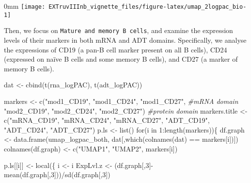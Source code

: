 \documentclass[]{article}
\newcommand{\hlnum}[1]{\textcolor[rgb]{0.816,0.125,0.439}{#1}}%
\newcommand{\hlstr}[1]{\textcolor[rgb]{0.251,0.627,0.251}{#1}}%
\newcommand{\hlcom}[1]{\textcolor[rgb]{0.502,0.502,0.502}{\textit{#1}}}%
\newcommand{\hlstd}[1]{\textcolor[rgb]{0.251,0.251,0.251}{#1}}%
\newcommand{\hlkwd}[1]{\textcolor[rgb]{0.878,0.439,0.125}{#1}}%
\newenvironment{Shaded}{\begin{myshaded}}{\end{myshaded}}
\newcommand{\DecValTok}[1]{\hlnum{#1}}
\newcommand{\SpecialCharTok}[1]{\hlstr{#1}}
\newcommand{\StringTok}[1]{\hlstr{#1}}
\newcommand{\CommentTok}[1]{\hlcom{#1}}
\newcommand{\OtherTok}[1]{{#1}}
\newcommand{\FunctionTok}[1]{\hlstd{#1}}
\newcommand{\ControlFlowTok}[1]{\hlkwd{#1}}
\newcommand{\NormalTok}[1]{\hlstd{#1}}
\begin{document}
\begin{adjustwidth}{\fltoffset}{0mm}
\texttt{[image: EXTruvIIInb\_vignette\_files/figure-latex/umap\_2logpac\_bio-1]} \end{adjustwidth}

Then, we focus on \texttt{Mature and memory B cells}, and examine the expression levels of their markers in both mRNA and ADT domains. Specifically, we analyse the expressions of CD19 (a pan-B cell marker present on all B cells), CD24 (expressed on naïve B cells and some memory B cells), and CD27 (a marker of memory B cells).

\begin{Shaded}
\begin{Highlighting}[]
\NormalTok{dat }\OtherTok{\textless{}{-}} \FunctionTok{cbind}\NormalTok{(}\FunctionTok{t}\NormalTok{(rna\_logPAC), }\FunctionTok{t}\NormalTok{(adt\_logPAC))}

\NormalTok{markers }\OtherTok{\textless{}{-}} \FunctionTok{c}\NormalTok{(}\StringTok{"mod1\_CD19"}\NormalTok{, }\StringTok{"mod1\_CD24"}\NormalTok{, }\StringTok{"mod1\_CD27"}\NormalTok{, }\CommentTok{\#mRNA domain}
             \StringTok{"mod2\_CD19"}\NormalTok{, }\StringTok{"mod2\_CD24"}\NormalTok{, }\StringTok{"mod2\_CD27"}\NormalTok{) }\CommentTok{\#protein domain}
\NormalTok{markers.title }\OtherTok{\textless{}{-}} \FunctionTok{c}\NormalTok{(}\StringTok{"mRNA\_CD19"}\NormalTok{, }\StringTok{"mRNA\_CD24"}\NormalTok{, }\StringTok{"mRNA\_CD27"}\NormalTok{, }
                   \StringTok{"ADT\_CD19"}\NormalTok{, }\StringTok{"ADT\_CD24"}\NormalTok{, }\StringTok{"ADT\_CD27"}\NormalTok{) }
\NormalTok{p.ls }\OtherTok{\textless{}{-}} \FunctionTok{list}\NormalTok{()}
\ControlFlowTok{for}\NormalTok{(i }\ControlFlowTok{in} \DecValTok{1}\SpecialCharTok{:}\FunctionTok{length}\NormalTok{(markers))\{}
\NormalTok{  df.graph }\OtherTok{\textless{}{-}} \FunctionTok{data.frame}\NormalTok{(umap\_logpac\_both, dat[,}\FunctionTok{which}\NormalTok{(}\FunctionTok{colnames}\NormalTok{(dat) }\SpecialCharTok{==}\NormalTok{ markers[i])])}
  \FunctionTok{colnames}\NormalTok{(df.graph) }\OtherTok{\textless{}{-}} \FunctionTok{c}\NormalTok{(}\StringTok{"UMAP1"}\NormalTok{, }\StringTok{"UMAP2"}\NormalTok{, markers[i])}
  
\NormalTok{  p.ls[[i]] }\OtherTok{\textless{}{-}} \FunctionTok{local}\NormalTok{(\{}
\NormalTok{    i }\OtherTok{\textless{}{-}}\NormalTok{ i}
\NormalTok{    ExpLvl.z }\OtherTok{\textless{}{-}}\NormalTok{ (df.graph[,}\DecValTok{3}\NormalTok{]}\SpecialCharTok{{-}}\FunctionTok{mean}\NormalTok{(df.graph[,}\DecValTok{3}\NormalTok{]))}\SpecialCharTok{/}\FunctionTok{sd}\NormalTok{(df.graph[,}\DecValTok{3}\NormalTok{])}


\end{Highlighting}
\end{Shaded}
\end{document}
